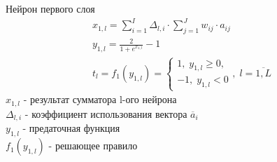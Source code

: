 \begin{frame}{Нейрон первого слоя}
    \begin{gather*}
        x_{1,l} = \sum_{i=1}^{I} \Delta_{l,i} \cdot \sum_{j=1}^{J}w_{ij}\cdot a_{ij} \\
        y_{1,l} = \frac{2}{1 + e^{x_{1,l}}} - 1 \\
        t_l = f_1(y_{1,l}) = 
        \begin{cases}   
            1,\; y_{1,l} \geq 0,\\
            -1,\; y_{1,l} < 0
        \end{cases}
        ,\; l = \overline{1,L}
    \end{gather*}
    $x_{1,l}$ - результат сумматора l-ого нейрона \\
    $\Delta_{l,i}$ - коэффициент использования вектора $\overline{a}_i$ \\
    $y_{1,l}$ - предаточная функция \\
    $f_1(y_{1,l})$ - решающее правило
\end{frame}
